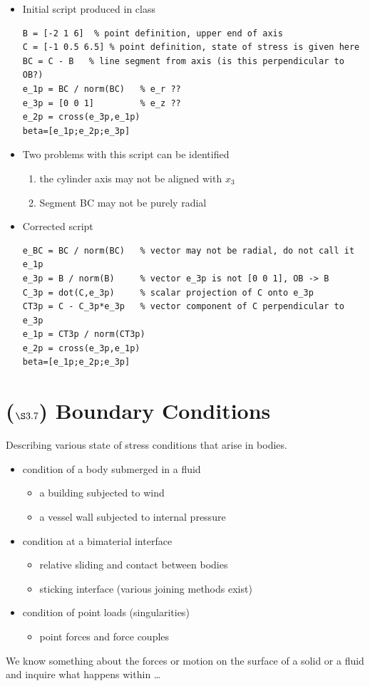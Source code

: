 \documentclass[11pt]{article}
\begin{document}
\begin{itemize}
\item Initial script produced in class
\begin{verbatim}
B = [-2 1 6]  % point definition, upper end of axis
C = [-1 0.5 6.5] % point definition, state of stress is given here
BC = C - B   % line segment from axis (is this perpendicular to OB?)
e_1p = BC / norm(BC)   % e_r ?? 
e_3p = [0 0 1]         % e_z ??
e_2p = cross(e_3p,e_1p)
beta=[e_1p;e_2p;e_3p]
\end{verbatim}
\item Two problems with this script can be identified
\begin{enumerate}
\item the cylinder axis may not be aligned with \(x_3\)
\item Segment BC may not be purely radial
\end{enumerate}
\item Corrected script     
\begin{verbatim}
e_BC = BC / norm(BC)   % vector may not be radial, do not call it e_1p
e_3p = B / norm(B)     % vector e_3p is not [0 0 1], OB -> B
C_3p = dot(C,e_3p)     % scalar projection of C onto e_3p
CT3p = C - C_3p*e_3p   % vector component of C perpendicular to e_3p
e_1p = CT3p / norm(CT3p)  
e_2p = cross(e_3p,e_1p)
beta=[e_1p;e_2p;e_3p]
\end{verbatim}
\end{itemize}
\section*{(\(\S3.7\)) Boundary Conditions}
\label{sec:orgfc3a8f6}
Describing various state of stress conditions that arise in bodies.
\begin{itemize}
\item condition of a body submerged in a fluid
\begin{itemize}
\item a building subjected to wind
\item a vessel wall subjected to internal pressure
\end{itemize}
\item condition at a bimaterial interface
\begin{itemize}
\item relative sliding and contact between bodies
\item sticking interface (various joining methods exist)
\end{itemize}
\item condition of point loads (singularities)
\begin{itemize}
\item point forces and force couples
\end{itemize}
\end{itemize}
We know something about the forces or motion on the surface of a solid or a fluid and inquire what happens within \ldots{}
\end{document}
